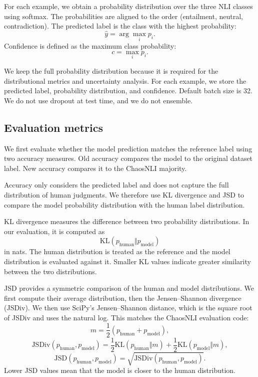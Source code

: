 \documentclass[11pt,a4paper]{article}
\begin{document}
For each example, we obtain a probability distribution over the three NLI classes using softmax. The probabilities are aligned to the order (entailment, neutral, contradiction). The predicted label is the class with the highest probability:
\[
\hat{y} = \arg\max_i p_i.
\]
Confidence is defined as the maximum class probability:
\[
c = \max_i p_i.
\]

We keep the full probability distribution because it is required for the distributional metrics and uncertainty analysis. For each example, we store the predicted label, probability distribution, and confidence. Default batch size is 32. We do not use dropout at test time, and we do not ensemble.

\subsection{Evaluation metrics}

We first evaluate whether the model prediction matches the reference label using two accuracy measures. Old accuracy compares the model to the original dataset label. New accuracy compares it to the ChaosNLI majority.

Accuracy only considers the predicted label and does not capture the full distribution of human judgments. We therefore use KL divergence and JSD to compare the model probability distribution with the human label distribution.

KL divergence measures the difference between two probability distributions. In our evaluation, it is computed as
\[
\mathrm{KL}(p_{\mathrm{human}} \Vert p_{\mathrm{model}})
\]
in nats. The human distribution is treated as the reference and the model distribution is evaluated against it. Smaller KL values indicate greater similarity between the two distributions.

JSD provides a symmetric comparison of the human and model distributions. We first compute their average distribution, then the Jensen--Shannon divergence (JSDiv). We then use SciPy's Jensen--Shannon distance, which is the square root of JSDiv and uses the natural log. This matches the ChaosNLI evaluation code:
\[
m=\frac{1}{2}\left(p_{\mathrm{human}}+p_{\mathrm{model}}\right),
\]
\[
\mathrm{JSDiv}(p_{\mathrm{human}}, p_{\mathrm{model}}) =
\frac{1}{2}\mathrm{KL}(p_{\mathrm{human}}\Vert m)
+
\frac{1}{2}\mathrm{KL}(p_{\mathrm{model}}\Vert m),
\]
\[
\mathrm{JSD}(p_{\mathrm{human}}, p_{\mathrm{model}})=\sqrt{\mathrm{JSDiv}(p_{\mathrm{human}}, p_{\mathrm{model}})}.
\]
Lower JSD values mean that the model is closer to the human distribution.
\end{document}
